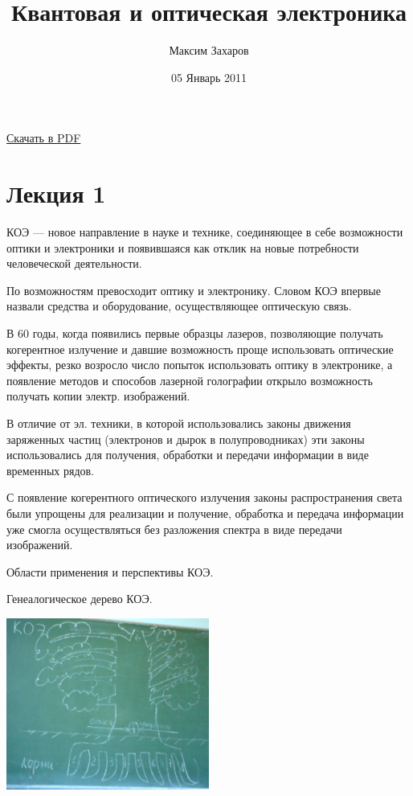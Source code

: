 \documentclass[12pt, russian, oneside, article]{ncc}
\begin{document}
\title{Квантовая и оптическая электроника}
\author{Максим Захаров}
\date{05 Январь 2011}
\maketitle

\setcounter{tocdepth}{3}
\tableofcontents
\vspace*{1cm}

\href{file:///home/maxim/Documents/Git/lectures/other/KOE_Lectures.pdf}{Скачать в PDF}

\section{Лекция 1}
\label{sec-1}


КОЭ --- новое направление в науке и технике, соединяющее в себе возможности оптики и электроники и появившаяся как отклик на новые потребности человеческой деятельности.

По возможностям превосходит оптику и электронику. Словом КОЭ впервые назвали средства и оборудование, осуществляющее оптическую связь.

В 60 годы, когда появились первые образцы лазеров, позволяющие получать когерентное излучение и давшие возможность проще использовать оптические эффекты, резко возросло число попыток использовать оптику в электронике, а появление методов и способов лазерной голографии открыло возможность получать копии электр. изображений.

В отличие от эл. техники, в которой использовались законы движения заряженных частиц (электронов и дырок в полупроводниках) эти законы использовались для получения, обработки и передачи информации в виде временных рядов.

С появление когерентного оптического излучения законы распространения света были упрощены для реализации и получение, обработка и передача информации уже смогла осуществляться без разложения спектра в виде передачи изображений.

Области применения и перспективы КОЭ. 

Генеалогическое дерево КОЭ.

\includegraphics[width=0.5\textwidth]{images/KOE/tree.png}
\end{document}
